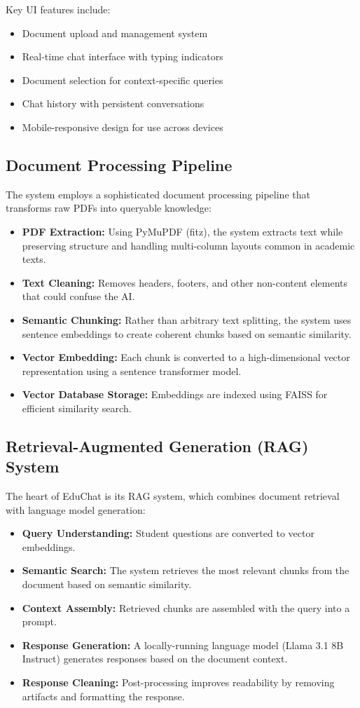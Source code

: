 \documentclass[12pt]{article}
\begin{document}
Key UI features include:
\begin{itemize}[leftmargin=2em]
    \item Document upload and management system
    \item Real-time chat interface with typing indicators
    \item Document selection for context-specific queries
    \item Chat history with persistent conversations
    \item Mobile-responsive design for use across devices
\end{itemize}

\subsection{Document Processing Pipeline}
The system employs a sophisticated document processing pipeline that transforms raw PDFs into queryable knowledge:
\begin{itemize}[leftmargin=2em]
    \item \textbf{PDF Extraction:} Using PyMuPDF (fitz), the system extracts text while preserving structure and handling multi-column layouts common in academic texts.
    \item \textbf{Text Cleaning:} Removes headers, footers, and other non-content elements that could confuse the AI.
    \item \textbf{Semantic Chunking:} Rather than arbitrary text splitting, the system uses sentence embeddings to create coherent chunks based on semantic similarity.
    \item \textbf{Vector Embedding:} Each chunk is converted to a high-dimensional vector representation using a sentence transformer model.
    \item \textbf{Vector Database Storage:} Embeddings are indexed using FAISS for efficient similarity search.
\end{itemize}

\subsection{Retrieval-Augmented Generation (RAG) System}
The heart of EduChat is its RAG system, which combines document retrieval with language model generation:
\begin{itemize}[leftmargin=2em]
    \item \textbf{Query Understanding:} Student questions are converted to vector embeddings.
    \item \textbf{Semantic Search:} The system retrieves the most relevant chunks from the document based on semantic similarity.
    \item \textbf{Context Assembly:} Retrieved chunks are assembled with the query into a prompt.
    \item \textbf{Response Generation:} A locally-running language model (Llama 3.1 8B Instruct) generates responses based on the document context.
    \item \textbf{Response Cleaning:} Post-processing improves readability by removing artifacts and formatting the response.
\end{itemize}
\end{document}

